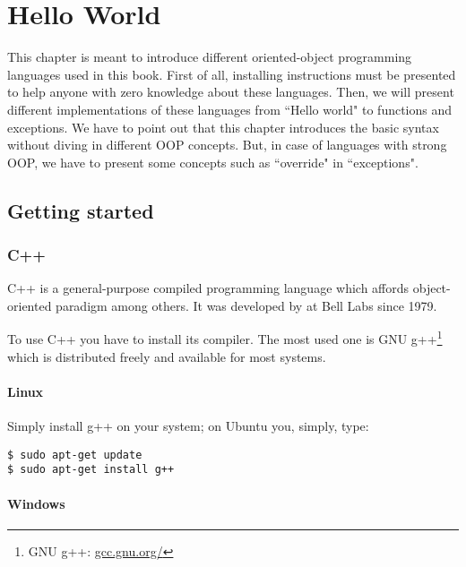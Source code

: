 \documentclass{KodeBook}
\begin{document}
	\chapter{Hello World}
\fi


\begin{introduction}
	This chapter is meant to introduce different oriented-object programming languages used in this book. 
	First of all, installing instructions must be presented to help anyone with zero knowledge about these languages. 
	Then, we will present different implementations of these languages from ``Hello world" to functions and exceptions. 
	We have to point out that this chapter introduces the basic syntax without diving in different OOP concepts.
	But, in case of languages with strong OOP, we have to present some concepts such as ``override" in ``exceptions".
\end{introduction}


\section{Getting started}

\subsection{C++}

C++ is a general-purpose compiled programming language which affords object-oriented paradigm among others. 
It was developed by  at Bell Labs since 1979.

To use C++ you have to install its compiler. 
The most used one is GNU g++\footnote{GNU g++: \url{gcc.gnu.org/}} which is distributed freely and available for most systems.

\subsubsection{Linux}
Simply install g++ on your system; on Ubuntu you, simply, type:
\begin{lstlisting}[style=shellStyle]
$ sudo apt-get update
$ sudo apt-get install g++
\end{lstlisting}

\subsubsection{Windows}
\end{document}
